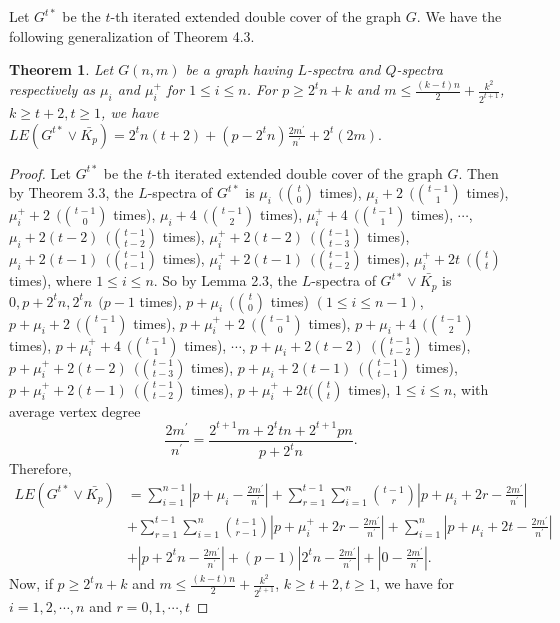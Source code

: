 \documentclass[12pt,a4paper]{amsart}
\newtheorem{theorem}{Theorem}[section]
\theoremstyle{theorem}
\theoremstyle{definition}
\numberwithin{equation}{section} \makeatletter
\begin{document}
 \indent Let $G^{t*}$ be the $t$-th iterated extended double cover of the graph $G$. We have the following generalization of Theorem 4.3.
 \begin{theorem}
 Let $G(n,m)$ be a graph having $L$-spectra and $Q$-spectra respectively as $\mu_i$ and $ \mu_i^+$ for $1\leq i\leq n $. For $p\geq 2^tn+k$ and $m\leq \frac{(k-t)n}{2}+\frac{k^2}{2^{t+1}}$, $k\geq t+2, t\geq 1$, we have $LE(G^{t*}\vee \bar{K_p})=2^tn(t+2)+(p-2^tn)\frac{2m^{\prime}}{n^{\prime}}+2^t(2m).$
 \end{theorem}
 \begin{proof}
 Let $G^{t*}$ be the $t$-th iterated extended double cover of the graph $G$. Then by Theorem 3.3, the $L$-spectra of $G^{t*}$ is $\mu_i~~ ({t \choose 0}$ times), $\mu_i+2~~ ({t-1 \choose 1}$ times), $\mu_i^{+}+2~~ ({t-1 \choose 0}$ times), $\mu_i+4 ~~({t-1 \choose 2}$ times), $\mu^{+}_i+4~~ ({t-1 \choose 1}$ times), $\cdots$, $\mu_i+2(t-2)~~ ({t-1 \choose t-2}$ times), $\mu_i^{+}+2(t-2)~~ ({t-1 \choose t-3}$ times), $\mu_i+2(t-1)~~ ({t-1 \choose t-1}$ times), $\mu_i^{+}+2(t-1)~~ ({t-1 \choose t-2}$ times), $\mu_i^{+}+2t ~~({t \choose t}$ times), where $1\leq i \leq n$. So by Lemma 2.3, the $L$-spectra of $G^{t*}\vee \bar{K_p}$ is $0, p+2^tn, 2^tn~~ (p-1$ times), $p+\mu_i ~~({t \choose 0}$ times) $(1\leq i\leq n-1)$, $p+\mu_i+2 ~~({t-1 \choose 1}$ times), $p+\mu_i^{+}+2 ~~({t-1 \choose 0}$ times), $p+\mu_i+4 ~~({t-1 \choose 2}$ times), $p+\mu^{+}_i+4 ~~({t-1 \choose 1}$ times), $\cdots$, $p+\mu_i+2(t-2) ~~({t-1 \choose t-2}$ times), $p+\mu_i^{+}+2(t-2) ~~({t-1 \choose t-3}$ times), $p+\mu_i+2(t-1) ~~({t-1 \choose t-1}$ times), $p+\mu_i^{+}+2(t-1) ~~({t-1 \choose t-2}$ times), $p+\mu_i^{+}+2t ({t \choose t}$ times),  $1\leq i \leq n$, with average vertex degree $$\frac{2m^{\prime}}{n^{\prime}}=\frac{2^{t+1}m+2^ttn+2^{t+1}pn}{p+2^tn}.$$
 Therefore,
 \begin{align*}
 LE(G^{t*}\vee \bar{K_p})&=\sum\limits_{i=1}^{n-1}|p+\mu_i-\frac{2m^{\prime}}{n^{\prime}}|+\sum\limits_{r=1}^{t-1}\sum\limits_{i=1}^{n}{t-1 \choose r}|p+\mu_i+2r-\frac{2m^{\prime}}{n^{\prime}}|\\&+\sum\limits_{r=1}^{t-1}\sum\limits_{i=1}^{n}{t-1 \choose r-1}|p+\mu_i^{+}+2r-\frac{2m^{\prime}}{n^{\prime}}|+\sum\limits_{i=1}^{n}|p+\mu_i+2t-\frac{2m^{\prime}}{n^{\prime}}|\\&+|p+2^tn-\frac{2m^{\prime}}{n^{\prime}}|+(p-1)|2^tn-\frac{2m^{\prime}}{n^{\prime}}|+|0-\frac{2m^{\prime}}{n^{\prime}}|.
 \end{align*}
 Now, if $p\geq 2^tn+k$ and $m\leq \frac{(k-t)n}{2}+\frac{k^2}{2^{t+1}}$, $k\geq t+2, t\geq 1$, we have for $i=1,2,\cdots,n$ and $r=0,1,\cdots,t$

\end{proof}
\end{document}
